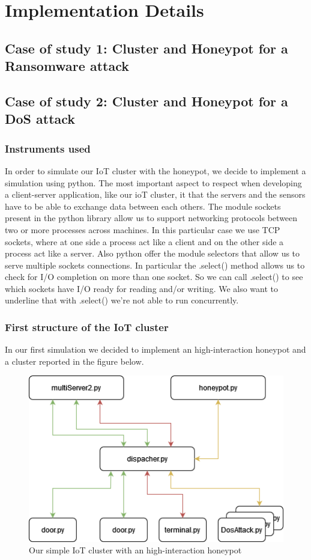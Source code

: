 \chapter{Implementation Details}
\section{Case of study 1: Cluster and Honeypot for a Ransomware attack}
\section{Case of study 2: Cluster and Honeypot for a DoS attack}
\subsection{Instruments used}
In order to simulate our IoT cluster with the honeypot, we decide to implement a simulation using python. The most important aspect 
to respect when developing a client-server application, like our ioT cluster, it that the servers and the sensors have to be able to exchange data 
between each others. The module sockets present in  the python library allow us to support networking protocols between two or more processes across machines. In this particular case we use TCP sockets, where at one side a process act like a client and on the other side a process act like a server. Also python offer the module selectors that allow us to serve multiple sockets connections. In particular the .select() method allows us to check for I/O completion on more than one socket. So we can call .select() to see which sockets have I/O ready for reading and/or writing.  We also want to underline that with .select()  we’re not able to run concurrently. 
\subsection{ First structure of the IoT cluster}
In our first simulation we decided to implement an high-interaction honeypot and a cluster reported in the figure below.
\begin{figure}[h!]
  \centering
  \includegraphics[width = 12cm]{images/HighInterationHoneypot.drawio.png}
  \caption{Our simple IoT cluster with an high-interaction honeypot}
  \label{fig:DosImpl1}
\end{figure}
\FloatBarrier
\noindent


